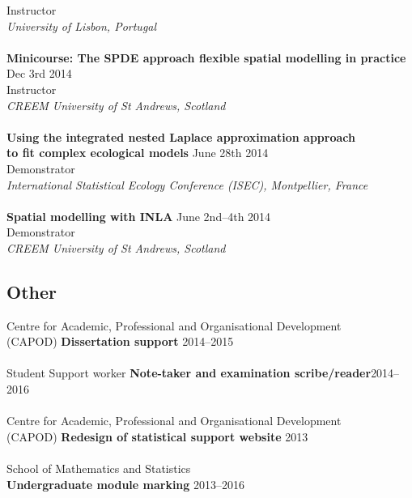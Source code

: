 \documentclass[10pt,letter]{article}
\begin{document}
 Instructor\\
 {\sl University of Lisbon, Portugal}\\
 \hdashrule[0.5ex]{4cm}{1pt}{1pt}\\
  {\textbf{{Minicourse: The SPDE approach flexible spatial modelling in practice}}} \hfill Dec 3rd  2014\\
 Instructor\\
 {\sl CREEM University of St Andrews, Scotland}\\ 
 \hdashrule[0.5ex]{4cm}{1pt}{1pt}\\
\noindent
    \textbf {Using the integrated nested Laplace approximation approach} \\
    \textbf{to fit complex ecological models}  \hfill June 28th 2014\\
 Demonstrator\\
 {\sl International Statistical Ecology Conference (ISEC), Montpellier, France}\\
 \hdashrule[0.5ex]{4cm}{1pt}{1pt}\\
{\textbf{{Spatial modelling with INLA}}} \hfill June 2nd--4th  2014\\
 Demonstrator\\
 {\sl CREEM University of St Andrews, Scotland}\\ 

  \vspace{1mm}
 \subsection*{Other}
 \vspace{1mm}

 
 Centre for Academic, Professional and Organisational Development\\ (CAPOD) \textbf{Dissertation support} \hfill{2014--2015}\\
 \hdashrule[0.5ex]{4cm}{1pt}{1pt}\\
Student Support worker \textbf{Note-taker and examination scribe/reader}\hfill {2014--2016}\\
\hdashrule[0.5ex]{4cm}{1pt}{1pt}\\
 Centre for Academic, Professional and Organisational Development\\ (CAPOD) \textbf{Redesign of statistical support website} \hfill{2013}\\
 \hdashrule[0.5ex]{4cm}{1pt}{1pt}\\
School of Mathematics and Statistics\\ \textbf{Undergraduate module marking} \hfill{2013--2016}\\
 
\end{document}
